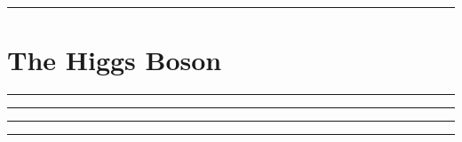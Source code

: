 
\noindent\rule{7in}{2.8pt}
\section{The Higgs Boson}
    
\begin{problem}{17.0}

\end{problem}

\begin{solution}


\end{solution}

\noindent\rule{7in}{1.5pt}


\begin{problem}{17.1}

\end{problem}

\begin{solution}


\end{solution}

\noindent\rule{7in}{1.5pt}


\begin{problem}{17.2}

\end{problem}

\begin{solution}


\end{solution}

\noindent\rule{7in}{1.5pt}


\begin{problem}{17.3}

\end{problem}

\begin{solution}


\end{solution}

\noindent\rule{7in}{1.5pt}

